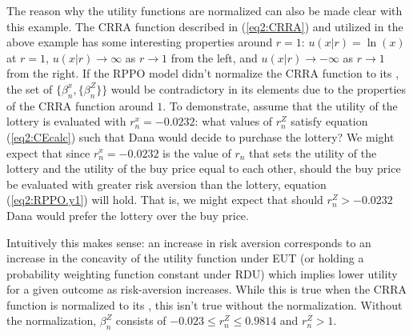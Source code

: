 \documentclass[../main.tex]{subfiles}
\begin{document}
The reason why the utility functions are normalized can also be made clear with this  example.
The CRRA function described in (\ref{eq2:CRRA}) and utilized in the above example has some interesting properties around $r=1$: $u(x|r) = \ln(x)$ at $r=1$, $u(x|r) \to \infty$ as $r \to 1$ from the left, and $u(x|r) \to -\infty$ as $r \to 1$ from the right.{\footnotemark}
If the RPPO model didn't normalize the CRRA function to its {\CE}, the set of $\{\beta_n^x,\{\beta_n^Z\}\}$  would be contradictory in its elements due to the properties of the CRRA function around $1$.
To demonstrate, assume that the utility of the lottery is evaluated with $r_n^x = -0.0232$: what values of $r_n^Z$ satisfy equation (\ref{eq2:CEcalc}) such that Dana would decide to purchase the lottery? We might expect that since $r_n^x = -0.0232$ is the value of $r_n$ that sets the utility of the lottery and the utility of the buy price equal to each other,  should the buy price be evaluated with greater risk aversion than the lottery, equation (\ref{eq2:RPPO.y1}) will hold.
That is, we might expect that should $r_n^Z > -0.0232$ Dana would prefer the lottery over the buy price.

\addtocounter{footnote}{-1}

Intuitively this makes sense: an increase in risk aversion corresponds to an increase in the concavity of the utility function under EUT (or holding a probability weighting function constant under RDU) which implies lower utility for a given outcome as risk-aversion increases.
While this is true when the CRRA function is normalized to its {\CE}, this isn't true without the normalization.
Without the normalization, $\beta_n^Z$ consists of $-0.023 \leq r_n^Z \leq 0.9814$ and $r_n^Z > 1$.
\end{document}
